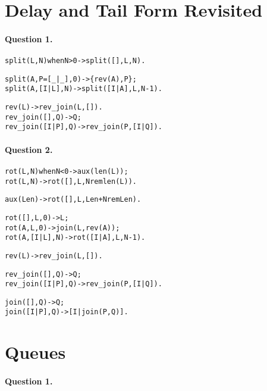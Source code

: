 \section*{Delay and Tail Form Revisited}
\label{ans:delay_and_tail_form_revisited}


\medskip

\paragraph{Question 1.}
\begin{alltt}
split(L,N) when N > 0 -> split([],L,N).

split(A,P=[\_|\_],0) -> \{rev(A),P\};
split(A,  [I|L],N) -> split([I|A],L,N-1).

% \emph{Reminder}
%
rev(L) -> rev_join(L,[]).
rev_join(   [],Q) -> Q;
rev_join([I|P],Q) -> rev_join(P,[I|Q]).
\end{alltt}

\medskip

\paragraph{Question 2.}
\begin{alltt}
rot(L,N) when N < 0 -> aux(len(L));
rot(L,N)            -> rot([],L,N rem len(L)).

aux(Len) -> rot([],L,Len + N rem Len).

rot([],    L,0) -> L;
rot( A,    L,0) -> join(L,rev(A));
rot( A,[I|L],N) -> rot([I|A],L,N-1).

% \emph{Reminder}
%
rev(L) -> rev_join(L,[]).

rev_join(   [],Q) -> Q;
rev_join([I|P],Q) -> rev_join(P,[I|Q]).

join(   [],Q) -> Q;
join([I|P],Q) -> [I|join(P,Q)].
\end{alltt}

\section*{Queues}
\label{ans:queues}


\medskip

\paragraph{Question 1.}


